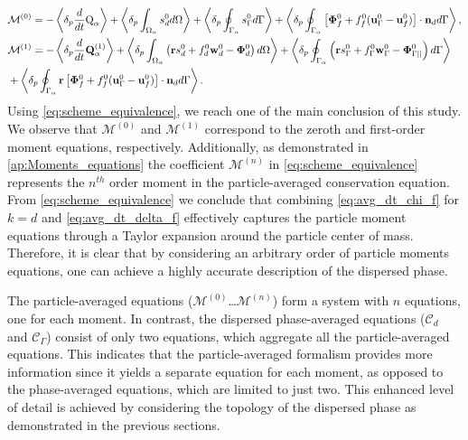 \begin{align}
    &\mathcal{M}^{(0)}
    = 
    - \left<\delta_p \frac{d}{dt} {\text Q_\alpha}\right>
    + \left<\delta_p \int_{\Omega_{\alpha}}  s_d^0  d\Omega\right>
    + \left<\delta_p \oint_{\Gamma_{\alpha}}  s_\Gamma ^0  d\Gamma\right>
    + \left<\delta_p \oint_{\Gamma_{\alpha}}  
    \left[\mathbf{\Phi}_f^0 
    + f_f^0 (\textbf{u}_\Gamma ^0-\textbf{u}_f^0) \right] \cdot \textbf{n}_d  d\Gamma\right>,\\
    &\mathcal{M}^{(1)} =
    -  \left<\delta_p \frac{d}{dt} {\textbf{Q}_\alpha^{(1)}}\right>
     + \left<\delta_p \int_{\Omega_{\alpha}}  \left(
        \textbf{r} s_d^0         
        + f_d^0  \textbf{w}_d^0 
        - \mathbf{\Phi}_d^0
    \right)  d\Omega\right>
    + \left<\delta_p \oint_{\Gamma_{\alpha}}  \left(
        \textbf{r}s_\Gamma ^0
        + f_\Gamma ^0 \textbf{w}_\Gamma ^0
        - \mathbf{\Phi}_{\Gamma||}^0
    \right)  d\Gamma\right> \nonumber\\
    &+ \left<\delta_p \oint_{\Gamma_{\alpha}}  \textbf{r} \left[
        \mathbf{\Phi}_f^0
        + f_f^0 (\textbf{u}_\Gamma ^0-\textbf{u}_f^0)
    \right]\cdot \textbf{n}_d   d\Gamma\right>.
\end{align}
Using \ref{eq:scheme_equivalence}, we reach one of the main conclusion of this study. 
We observe that $\mathcal{M}^{(0)}$ and $\mathcal{M}^{(1)}$ correspond to the zeroth and first-order moment equations, respectively. 
Additionally, as demonstrated in \ref{ap:Moments_equations} the coefficient $\mathcal{M}^{(n)}$ in \ref{eq:scheme_equivalence} represents the $n^{th}$ order moment in the particle-averaged conservation equation. 
From \ref{eq:scheme_equivalence} we conclude that combining \ref{eq:avg_dt_chi_f} for $k=d$ and \ref{eq:avg_dt_delta_f} effectively captures the particle moment equations through a Taylor expansion around the particle center of mass. 
Therefore, it is clear that by considering an arbitrary order of particle moments equations, one can achieve a highly accurate description of the dispersed phase.


The particle-averaged equations ($\mathcal{M}^{(0)}$\ldots $\mathcal{M}^{(n)}$) form a system with $n$ equations, one for each moment. 
In contrast, the dispersed phase-averaged equations ($\mathcal{C}_d$ and $\mathcal{C}_\Gamma$) consist of only two equations, which aggregate all the particle-averaged equations. 
This indicates that the particle-averaged formalism provides more information since it yields a separate equation for each moment, as opposed to the phase-averaged equations, which are limited to just two. 
This enhanced level of detail is achieved by considering the topology of the dispersed phase as demonstrated in the previous sections.




